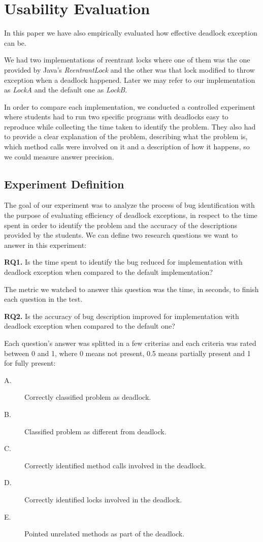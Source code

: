 \section{Usability Evaluation}

In this paper we have also empirically evaluated how effective deadlock exception can be.

We had two implementations of reentrant locks where one of them was the one provided by
Java's \emph{ReentrantLock} and the other was that lock modified to throw exception when
a deadlock happened. Later we may refer to our implementation as \emph{LockA} and the default
one as \emph{LockB}.

In order to compare each implementation, we conducted
a controlled experiment where students had to run two specific programs with deadlocks
easy to reproduce while collecting the time taken to identify the problem. They also
had to provide a clear explanation of the problem, describing what the problem is, which method
calls were involved on it and a description of how it happens, so we could measure answer precision.

\subsection{Experiment Definition}

The goal of our experiment was to analyze the process of bug identification with the purpose of evaluating efficiency of deadlock exceptions,
in respect to the time spent in order to identify the problem and the accuracy of the descriptions provided by the students. We can define two
research questions we want to answer in this experiment:

{\bf RQ1.} Is the time spent to identify the bug reduced for implementation with deadlock exception when compared to the default implementation?

The metric we watched to answer this question was the time, in seconds, to finish each question in the test.

{\bf RQ2.} Is the accuracy of bug description improved for implementation with deadlock exception when compared to the default one?

Each question's answer was splitted in a few criterias and each criteria was rated between 0 and 1, where 0 means not present, 0.5 means partially present and 1 for fully present:

\begin{description}
\item[A.] Correctly classified problem as deadlock.
\item[B.] Classified problem as different from deadlock.
\item[C.] Correctly identified method calls involved in the deadlock.
\item[D.] Correctly identified locks involved in the deadlock. 
\item[E.] Pointed unrelated methods as part of the deadlock.
\end{description}

